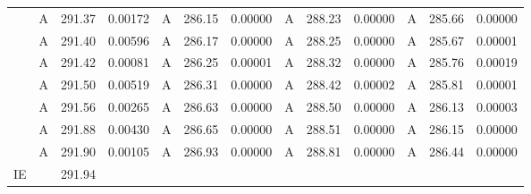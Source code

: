 \documentclass[journal=jctcce,manuscript=article]{achemso}
\begin{document}
\begin{table}
\begin{tabular}{l|lcc|lcc|lcc|lcc}
& A & 291.37 & 0.00172 & A & 286.15 & 0.00000 & A & 288.23 & 0.00000 & A & 285.66 & 0.00000 \\ 
& A & 291.40 & 0.00596 & A & 286.17 & 0.00000 & A & 288.25 & 0.00000 & A & 285.67 & 0.00001 \\ 
& A & 291.42 & 0.00081 & A & 286.25 & 0.00001 & A & 288.32 & 0.00000 & A & 285.76 & 0.00019 \\ 
& A & 291.50 & 0.00519 & A & 286.31 & 0.00000 & A & 288.42 & 0.00002 & A & 285.81 & 0.00001 \\ 
& A & 291.56 & 0.00265 & A & 286.63 & 0.00000 & A & 288.50 & 0.00000 & A & 286.13 & 0.00003 \\ 
& A & 291.88 & 0.00430 & A & 286.65 & 0.00000 & A & 288.51 & 0.00000 & A & 286.15 & 0.00000 \\ 
& A & 291.90 & 0.00105 & A & 286.93 & 0.00000 & A & 288.81 & 0.00000 & A & 286.44 & 0.00000 \\ 
\hline
IE & &291.94  \\
\hline
  \end{tabular}
\end{table}
\end{document}
